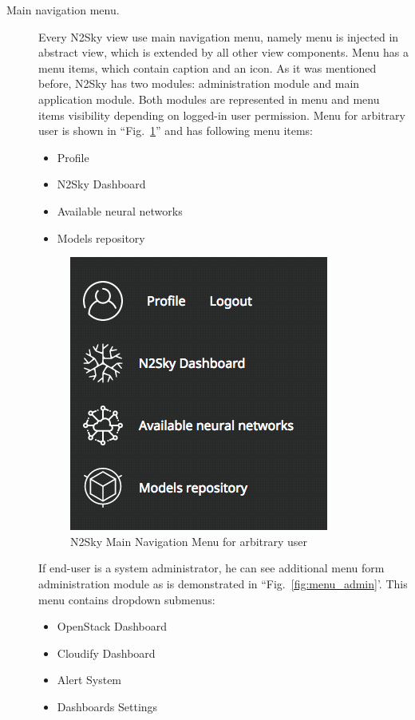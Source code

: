 \begin{description}
\item[Main navigation menu.] Every N2Sky view use main navigation menu, namely menu is injected in abstract view, which is extended by all other view components. Menu has a menu items, which contain caption and an icon. As it was mentioned before, N2Sky has two modules: administration module and main application module. Both modules are represented in menu and menu items visibility depending on logged-in user permission. 
Menu for arbitrary user is shown in ``Fig.~\ref{fig:menu_user}''  and has following menu items:

\begin{itemize}
\item Profile 
\item N2Sky Dashboard
\item Available neural networks
\item Models repository
\end{itemize}

 
 \begin{figure}[htbp]
\begin{center}
  \includegraphics[scale=0.65]{components/3/components/menu_user.png}
  \caption{N2Sky Main Navigation Menu for arbitrary user}
  \label{fig:menu_user}
\end{center}
\end{figure}

If end-user is a system administrator, he can see additional menu form administration module as is demonstrated in ``Fig.~\ref{fig:menu_admin}'. This menu contains dropdown submenus: 

\begin{itemize}
\item OpenStack Dashboard
\item Cloudify Dashboard
\item Alert System
\item Dashboards Settings
\end{itemize}



\end{description}
